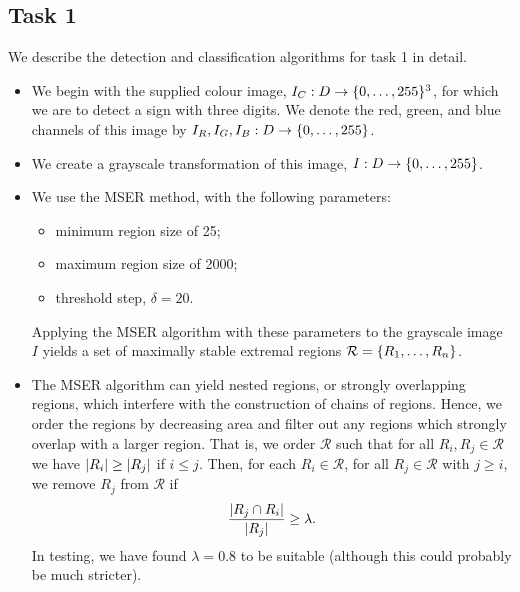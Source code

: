 \documentclass{article}
\begin{document}
\subsection{Task 1}
\label{sec:imp-1}

We describe the detection and classification algorithms for task 1 in detail.
\begin{itemize}
\item
  We begin with the supplied colour image,
  $I_{C} : D \to \lbrace0, \dotsc, 255\rbrace^{3}$, for which we are to detect a sign
  with three digits.
  We denote the red, green, and blue channels of this image by
  $I_{R}, I_{G}, I_{B} : D \to \lbrace0, \dotsc, 255\rbrace$.

\item
  We create a grayscale transformation of this image,
  $I : D \to \lbrace0, \dotsc, 255\rbrace$.

\item
  We use the MSER method, with the following parameters:
  \begin{itemize}
  \item
    minimum region size of 25;
  \item
    maximum region size of 2000;
  \item
    threshold step, $\delta = 20$.
  \end{itemize}
  Applying the MSER algorithm with these parameters to the grayscale image $I$
  yields a set of maximally stable extremal regions
  $\mathcal{R} = \lbrace R_{1}, \dotsc, R_{n}\rbrace$.

\item
  The MSER algorithm can yield nested regions, or strongly overlapping regions,
  which interfere with the construction of chains of regions.
  Hence, we order the regions by decreasing area and filter out any regions
  which strongly overlap with a larger region.
  That is, we order $\mathcal{R}$ such that for all
  $R_{i}, R_{j} \in \mathcal{R}$ we have $\lvert R_{i}\rvert \geq \lvert R_{j}\rvert$ if
  $i \leq j$.
  Then, for each $R_{i} \in \mathcal{R}$, for all $R_{j} \in \mathcal{R}$ with
  $j \geq i$, we remove $R_{j}$ from $\mathcal{R}$ if
  \begin{equation*}
    \frac
    {
      \lvert
        R_{j}
        \cap
        R_{i}
      \rvert
    }
    {
      \lvert
        R_{j}
      \rvert
    }
    \geq
    \lambda
    .
  \end{equation*}
  In testing, we have found $\lambda = 0.8$ to be suitable (although this could
  probably be much stricter).


\end{itemize}
\end{document}
